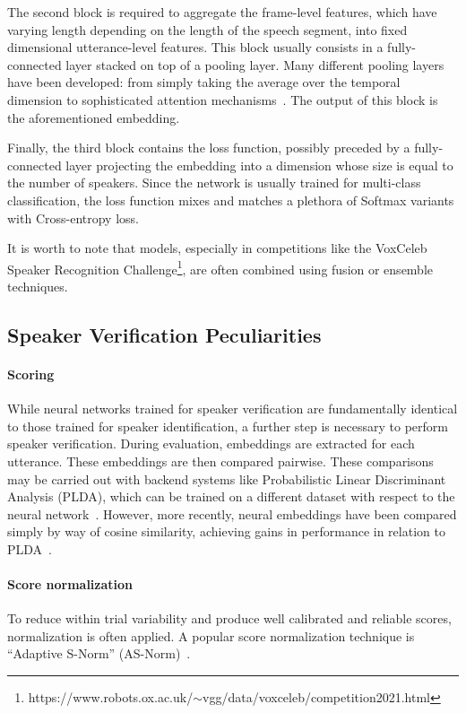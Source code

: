 \documentclass[conference]{IEEEtran}
\begin{document}
The second block is required to aggregate the frame-level features, which have varying length depending on the length of the speech segment, into fixed dimensional utterance-level features. This block usually consists in a fully-connected layer stacked on top of a pooling layer. Many different pooling layers have been developed: from simply taking the average over the temporal dimension to sophisticated attention mechanisms~\cite{cai2018exploring}. The output of this block is the aforementioned embedding.

Finally, the third block contains the loss function, possibly preceded by a fully-connected layer projecting the embedding into a dimension whose size is equal to the number of speakers. Since the network is usually trained for multi-class classification, the loss function mixes and matches a plethora of Softmax variants with Cross-entropy loss.

It is worth to note that models, especially in competitions like the VoxCeleb Speaker Recognition Challenge\footnote{https://www.robots.ox.ac.uk/$\sim$vgg/data/voxceleb/competition2021.html}, are often combined using fusion or ensemble techniques.

\subsection{Speaker Verification Peculiarities}

\paragraph{Scoring}While neural networks trained for speaker verification are fundamentally identical to those trained for speaker identification, a further step is necessary to perform speaker verification. During evaluation, embeddings are extracted for each utterance. These embeddings are then compared pairwise. These comparisons may be carried out with backend systems like Probabilistic Linear Discriminant Analysis (PLDA), which can be trained on a different dataset with respect to the neural network~\cite{snyder2017deep}. However, more recently, neural embeddings have been compared simply by way of cosine similarity, achieving gains in performance in relation to PLDA~\cite{cai2018exploring}.

\paragraph{Score normalization}To reduce within trial variability and produce well calibrated and reliable scores, normalization is often applied. A popular score normalization technique is ``Adaptive S-Norm'' (AS-Norm)~\cite{matejka2017asnorm,cumani2011comparison}.
\end{document}
